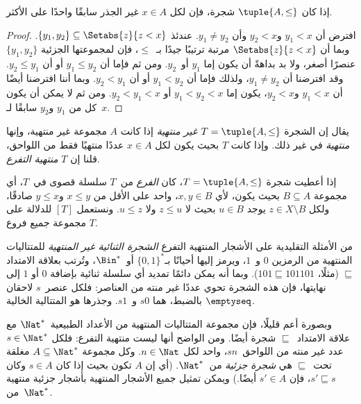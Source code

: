 \documentclass[../../../include/open-logic-section]{subfiles}
\begin{document}
\begin{prop}
إذا كان $\tuple{A,\le}$ شجرة، فإن لكل $x \in A$ غير الجذر سابقًا واحدًا
على الأكثر.
\end{prop}

\begin{proof}
  افترض أن $y_1 < x$ و$y_2 < x$ وأن $y_1 \neq y_2$. عندئذ
  $\{y_1, y_2\} \subseteq \Setabs{z}{z<x}$. وبما أن
  $\Setabs{z}{z<x}$ مرتبة ترتيبًا جيدًا بـ~$\le$، فإن لمجموعتها الجزئية
  $\{y_1, y_2\}$ عنصرًا أصغر، ولا بد بداهةً أن يكون إما $y_1$ أو~$y_2$.
  ومن ثم فإما أن $y_1 \le y_2$ أو أن $y_2 \le y_1$. وقد افترضنا أن
  $y_1 \neq y_2$، ولذلك فإما أن $y_1 < y_2$ أو أن $y_2 < y_1$. وبما
  أننا افترضنا أيضًا أن $y_1 < x$ و$y_2 < x$، يكون إما
  $y_1 < y_2 < x$ أو $y_2 < y_1 < x$. ومن ثم لا يمكن أن يكون كل من
  $y_1$ و$y_2$ سابقًا لـ~$x$.
\end{proof}

\begin{defn}
يقال إن الشجرة $T = \tuple{A, \le}$ \emph{غير منتهية} إذا كانت $A$
مجموعة غير منتهية، وإنها \emph{منتهية} في غير ذلك. وإذا كانت $T$ بحيث
يكون لكل $x \in A$ عددًا منتهيًا فقط من اللواحق، قلنا إن $T$
\emph{منتهية التفرع}.
\end{defn}

\begin{defn}[الفروع]
إذا أعطيت شجرة $T = \tuple{A, \le}$، كان \emph{الفرع} من~$T$ سلسلة
قصوى في~$T$، أي مجموعة $B \subseteq A$ بحيث يكون، لأي $x, y \in B$،
واحد على الأقل من $x \le y$ و$y \le x$ صادقًا، ولكل
$z \in X \setminus B$ يوجد $u \in B$ بحيث لا $z \le u$ ولا $u \le z$.
%
ونستعمل $[T]$ للدلالة على مجموعة جميع فروع $T$.
\end{defn}

\begin{ex}
من الأمثلة التقليدية على الأشجار المنتهية التفرع \emph{الشجرة الثنائية
غير المنتهية} للمتتاليات المنتهية من الرمزين $0$ و~$1$، ويرمز إليها
أحيانًا بـ$\{0,1\}^*$ أو~$\Bin^*$، وتُرتب بعلاقة الامتداد $\sqsubseteq$
(مثلًا، $101 \sqsubseteq 101101$). وبما أنه يمكن دائمًا تمديد أي سلسلة
ثنائية بإضافة $0$ أو $1$ إلى نهايتها، فإن هذه الشجرة تحوي عددًا غير
منته من العناصر: فلكل عنصر~$s$ لاحقان بالضبط، هما $s0$ و~$s1$. وجذرها
هو المتتالية الخالية $\emptyseq$.
\end{ex}

\begin{ex}
وبصورة أعم قليلًا، فإن مجموعة المتتاليات المنتهية من الأعداد
الطبيعية~$\Nat^*$ مع علاقة الامتداد~$\sqsubseteq$ شجرة أيضًا. ومن الواضح
أنها ليست منتهية التفرع: فلكل $s \in \Nat^*$ عدد غير منته من اللواحق~$sn$،
واحد لكل $n \in \Nat$. وكل مجموعة $A \subseteq \Nat^*$ مغلقة
تحت~$\sqsubseteq$ هي \emph{شجرة جزئية} من~$\Nat^*$. (أي إن $A$ تكون بحيث
إذا كان $s \in A$ وكان $s' \sqsubseteq s$، فإن $s' \in A$ أيضًا.) ويمكن
تمثيل جميع الأشجار المنتهية بأشجار جزئية منتهية من~$\Nat^*$.
\end{ex}
\end{document}
